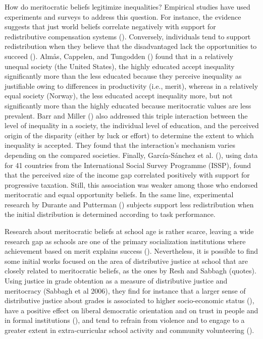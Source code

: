 \documentclass[
  letterpaper,
  DIV=11,
  numbers=noendperiod]{scrartcl}
\begin{document}
How do meritocratic beliefs legitimize inequalities? Empirical studies
have used experiments and surveys to address this question. For
instance, the evidence suggests that just world beliefs correlate
negatively with support for redistributive compensation systems
(). Conversely, individuals tend to support redistribution when they
believe that the disadvantaged lack the opportunities to succeed
(). Almås,
Cappelen, and Tungodden ()
found that in a relatively unequal society (the United States), the
highly educated accept inequality significantly more than the less
educated because they perceive inequality as justifiable owing to
differences in productivity (i.e., merit), whereas in a relatively equal
society (Norway), the less educated accept inequality more, but not
significantly more than the highly educated because meritocratic values
are less prevalent. Barr and Miller
() also addressed this triple
interaction between the level of inequality in a society, the individual
level of education, and the perceived origin of the disparity (either by
luck or effort) to determine the extent to which inequality is accepted.
They found that the interaction's mechanism varies depending on the
compared societies. Finally, García-Sánchez et al.
(), using data for 41
countries from the International Social Survey Programme (ISSP), found
that the perceived size of the income gap correlated positively with
support for progressive taxation. Still, this association was weaker
among those who endorsed meritocratic and equal opportunity beliefs. In
the same line, experimental research by Durante and Putterman
() subjects support less
redistribution when the initial distribution is determined according to
task performance.

Research about meritocratic beliefs at school age is rather scarce,
leaving a wide research gap as schools are one of the primary
socialization institutions where achievement based on merit explains
success ().
Nevertheless, it is possible to find some initial works focused on the
area of distributive justice at school that are closely related to
meritocratic beliefs, as the ones by Resh and Sabbagh (quotes). Using
justice in grade obtention as a measure of distributive justice and
meritocracy (Sabbagh et al 2006), they find for instance that a larger
sense of distributive justice about grades is associated to higher
socio-economic status (), have
a positive effect on liberal democratic orientation and on trust in
people and in formal institutions (), and tend to refrain from violence and to engage to a
greater extent in extra-curricular school activity and community
volunteering ().
\end{document}
